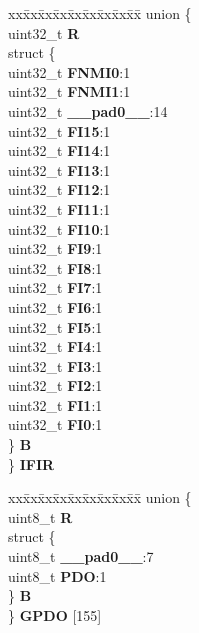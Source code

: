 \begin{DoxyCompactItemize}
\begin{tabbing}
\end{tabbing}\item 
\mbox{\label{structSIU__tag_a22e8928457e0c245a47f6a63d38f84fe}} 
\begin{tabbing}
xx\=xx\=xx\=xx\=xx\=xx\=xx\=xx\=xx\=\kill
union \{\\
\>uint32\_t {\bfseries R}\\
\>struct \{\\
\>\>uint32\_t {\bfseries FNMI0}:1\\
\>\>uint32\_t {\bfseries FNMI1}:1\\
\>\>uint32\_t {\bfseries \_\_pad0\_\_}:14\\
\>\>uint32\_t {\bfseries FI15}:1\\
\>\>uint32\_t {\bfseries FI14}:1\\
\>\>uint32\_t {\bfseries FI13}:1\\
\>\>uint32\_t {\bfseries FI12}:1\\
\>\>uint32\_t {\bfseries FI11}:1\\
\>\>uint32\_t {\bfseries FI10}:1\\
\>\>uint32\_t {\bfseries FI9}:1\\
\>\>uint32\_t {\bfseries FI8}:1\\
\>\>uint32\_t {\bfseries FI7}:1\\
\>\>uint32\_t {\bfseries FI6}:1\\
\>\>uint32\_t {\bfseries FI5}:1\\
\>\>uint32\_t {\bfseries FI4}:1\\
\>\>uint32\_t {\bfseries FI3}:1\\
\>\>uint32\_t {\bfseries FI2}:1\\
\>\>uint32\_t {\bfseries FI1}:1\\
\>\>uint32\_t {\bfseries FI0}:1\\
\>\} {\bfseries B}\\
\} {\bfseries IFIR}\\

\end{tabbing}\item 
\mbox{\label{structSIU__tag_adb3b31e8d170a18967a58b0495e44e37}} 
\begin{tabbing}
xx\=xx\=xx\=xx\=xx\=xx\=xx\=xx\=xx\=\kill
union \{\\
\>uint8\_t {\bfseries R}\\
\>struct \{\\
\>\>uint8\_t {\bfseries \_\_pad0\_\_}:7\\
\>\>uint8\_t {\bfseries PDO}:1\\
\>\} {\bfseries B}\\
\} {\bfseries GPDO} \mbox{[}155\mbox{]}\\


\end{tabbing}
\end{DoxyCompactItemize}
